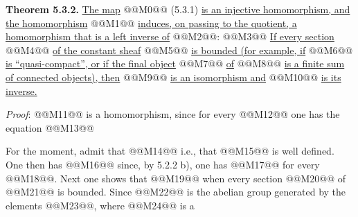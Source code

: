 
\textbf{Theorem 5.3.2.} \uline{The map} @@M0@@ (5.3.1) \uline{is an injective homomorphism, and the homomorphism}
@@M1@@
\uline{induces, on passing to the quotient, a homomorphism that is a left inverse of} @@M2@@:
@@M3@@
\uline{If every section} @@M4@@ \uline{of the constant sheaf} @@M5@@ \uline{is bounded (for example, if} @@M6@@ \uline{is ``quasi-compact'', or if the final object} @@M7@@ \uline{of} @@M8@@ \uline{is a finite sum of connected objects), then} @@M9@@ \uline{is an isomorphism and} @@M10@@ \uline{is its inverse.}

\emph{Proof}: @@M11@@ is a homomorphism, since for every @@M12@@ one has the equation
@@M13@@

For the moment, admit that
@@M14@@
i.e., that @@M15@@ is well defined. One then has
@@M16@@
since, by 5.2.2 b), one has
@@M17@@
for every @@M18@@. Next one shows that
@@M19@@
when every section @@M20@@ of @@M21@@ is bounded. Since @@M22@@ is the abelian group generated by the elements @@M23@@, where @@M24@@ is a
